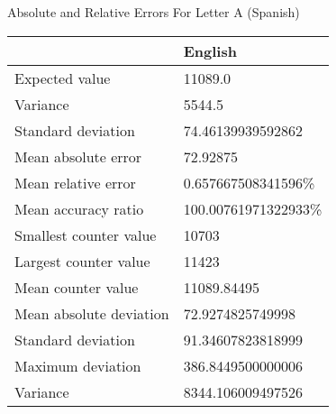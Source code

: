 \documentclass[]{revdetua}
\begin{document}
\begin{table}[!ht]
    \centering
    Absolute and Relative Errors For Letter A (Spanish)\linebreak\linebreak
    \begin{tabular}{|l|l|}
    \hline
        ~ & English \\ \hline
        Expected value & 11089.0 \\ \hline
        Variance & 5544.5 \\ \hline
        Standard deviation & 74.46139939592862 \\ \hline
        Mean absolute error & 72.92875 \\ \hline
        Mean relative error & 0.657667508341596\% \\ \hline
        Mean accuracy ratio & 100.00761971322933\% \\ \hline
        Smallest counter value & 10703 \\ \hline
        Largest counter value & 11423 \\ \hline
        Mean counter value & 11089.84495 \\ \hline
        Mean absolute deviation & 72.9274825749998 \\ \hline
        Standard deviation & 91.34607823818999 \\ \hline
        Maximum deviation & 386.8449500000006 \\ \hline
        Variance & 8344.106009497526 \\ \hline
    \end{tabular}
\end{table}
\end{document}
